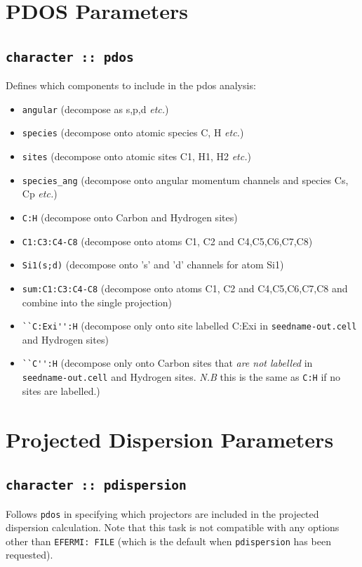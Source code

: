 \documentclass[a4paper,11pt,twoside]{book}
\begin{document}
{\section{PDOS Parameters}

\subsection[pdos]{\tt character :: pdos}
Defines which components to include in the pdos analysis:

\begin{itemize}
\item[{\bf --}]  \verb#angular# (decompose as s,p,d \emph{etc.})
\item[{\bf --}]  \verb#species#    (decompose onto atomic species C, H \emph{etc.})
\item[{\bf --}]  \verb#sites#    (decompose onto atomic sites C1, H1, H2 \emph{etc.})
\item[{\bf --}]  \verb#species_ang#    (decompose onto angular momentum channels and species Cs, Cp \emph{etc.})
\item[{\bf --}]  \verb#C:H#     (decompose onto Carbon and Hydrogen sites)
\item[{\bf --}]  \verb#C1:C3:C4-C8#  (decompose onto atoms C1, C2 and C4,C5,C6,C7,C8)
\item[{\bf --}]  \verb#Si1(s;d)#     (decompose onto 's' and 'd' channels for
  atom Si1)
\item[{\bf --}]  \verb#sum:C1:C3:C4-C8#  (decompose onto atoms C1, C2 and C4,C5,C6,C7,C8 and combine into the single projection)
\item[{\bf --}]  \verb#``C:Exi'':H#  (decompose only onto site labelled C:Exi in \verb#seedname-out.cell# and Hydrogen sites)
\item[{\bf --}]  \verb#``C'':H#  (decompose only onto Carbon sites that \textit{are not labelled} in \verb#seedname-out.cell# and Hydrogen sites. \textit{N.B} this is the same as  \verb#C:H# if no sites are labelled.)


\end{itemize}

\section{Projected Dispersion Parameters}

\subsection[pdispersion]{\tt character :: pdispersion}
Follows \verb#pdos# in specifying which projectors are included in the projected
dispersion calculation. Note that this task is not compatible with any options
other than \verb#EFERMI: FILE# (which is the default when \verb#pdispersion# has
been requested).

}
\end{document}
